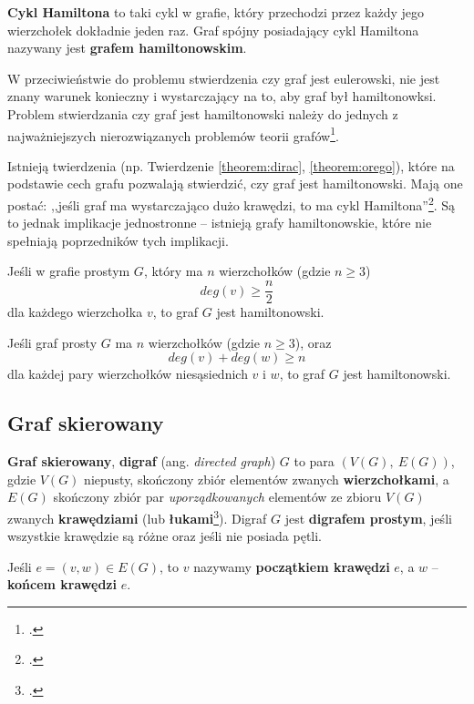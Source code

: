 \textbf{Cykl Hamiltona} to taki cykl w grafie, który przechodzi przez każdy jego wierzchołek dokładnie jeden raz. Graf spójny posiadający cykl Hamiltona nazywany jest \textbf{grafem hamiltonowskim}.

W przeciwieństwie do problemu stwierdzenia czy graf jest eulerowski, nie jest znany warunek konieczny i wystarczający na to, aby graf był hamiltonowksi. Problem stwierdzania czy graf jest hamiltonowski należy do jednych z najważniejszych nierozwiązanych problemów teorii grafów\footcite[54]{wilson}. 

Istnieją twierdzenia (np. Twierdzenie \ref{theorem:dirac}, \ref{theorem:orego}), które na podstawie cech grafu pozwalają stwierdzić, czy graf jest hamiltonowski. Mają one postać: ,,jeśli graf ma wystarczająco dużo krawędzi, to ma cykl Hamiltona''\footcite[54]{wilson}. Są to jednak implikacje jednostronne -- istnieją grafy hamiltonowskie, które nie spełniają poprzedników tych implikacji. 

\begin{theorem}[Dirac, 1952]\label{theorem:dirac}
Jeśli w grafie prostym $G$, który ma $n$ wierzchołków (gdzie $n \geq 3$)
\[deg(v) \geq \frac{n}{2}\] 
dla każdego wierzchołka $v$, to graf $G$ jest hamiltonowski.
\end{theorem}

\begin{theorem}[Orego, 1960]\label{theorem:orego}
Jeśli graf prosty $G$ ma $n$ wierzchołków (gdzie $n\geq 3$), oraz
\[
deg(v) + deg(w) \geq n
\]
dla każdej pary wierzchołków niesąsiednich $v$ i $w$, to graf $G$ jest hamiltonowski.
\end{theorem}

\subsection*{Graf skierowany}

\textbf{Graf skierowany}, \textbf{digraf} (ang. \textit{directed graph}) $G$ to para $(V(G),\ E(G))$, gdzie $V(G)$ niepusty, skończony zbiór elementów zwanych \textbf{wierzchołkami}, a $E(G)$ skończony zbiór par \emph{uporządkowanych} elementów ze zbioru $V(G)$ zwanych \textbf{krawędziami} (lub \textbf{łukami}\footcite[135]{wilson}). Digraf $G$ jest \textbf{digrafem prostym}, jeśli wszystkie krawędzie są różne oraz jeśli nie posiada pętli. 

Jeśli $e = (v,w) \in E(G)$, to $v$ nazywamy \textbf{początkiem krawędzi} $e$, a $w$ -- \textbf{końcem krawędzi} $e$.

